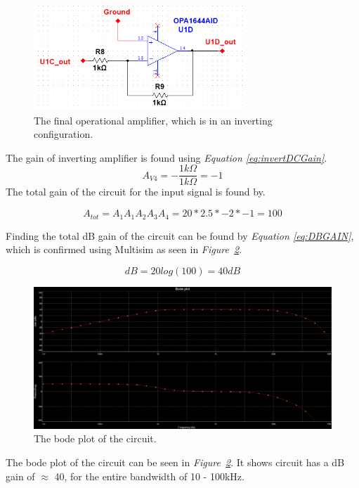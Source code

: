 \begin{figure}[h]
    \centering
    \includegraphics[width=0.70\textwidth]{graphics/OPamp4.png}
    \caption{The final operational amplifier, which is in an inverting configuration.}
    \label{fig:Opamp4}
\end{figure}


The gain of inverting amplifier is found using \textit{Equation \ref{eq:invertDCGain}}.
$$ A_{V4} = -\frac{1k \Omega}{1k \Omega} = -1$$
The total gain of the circuit for the input signal is found by.

$$A_{tot} = A_1A_1A_2A_3A_4 = 20*2.5*-2*-1 = 100$$

Finding the total dB gain of the circuit can be found by \textit{Equation \ref{eq:DBGAIN}}, which is confirmed using Multisim as seen in \textit{Figure~\ref{fig:bode}}.

$$dB = 20log(100) = 40dB$$


\begin{figure}[h]
    \centering
    \includegraphics[width=1.0\textwidth]{graphics/bodeNew.png}
    \caption{The bode plot of the circuit.}
    \label{fig:bode}
\end{figure}

The bode plot of the circuit can be seen in \textit{Figure~\ref{fig:bode}}.
It shows  circuit has a dB gain of $\approx$ 40, for the entire bandwidth of 10 - 100kHz.



